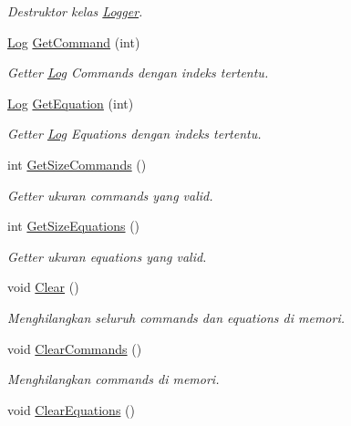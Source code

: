 \begin{DoxyCompactItemize}
\begin{DoxyCompactList}\small\item\em Destruktor kelas \hyperlink{class_logger}{Logger}. \end{DoxyCompactList}\item 
\hyperlink{class_log}{Log} \hyperlink{class_logger_a17879024b3d7becb09c6a4f97d3b0864}{Get\+Command} (int)
\begin{DoxyCompactList}\small\item\em Getter \hyperlink{class_log}{Log} Commands dengan indeks tertentu. \end{DoxyCompactList}\item 
\hyperlink{class_log}{Log} \hyperlink{class_logger_a375befae83c2783b4dae46345dab4466}{Get\+Equation} (int)
\begin{DoxyCompactList}\small\item\em Getter \hyperlink{class_log}{Log} Equations dengan indeks tertentu. \end{DoxyCompactList}\item 
int \hyperlink{class_logger_aeabc3b7d9fa5e616649f9779592907dd}{Get\+Size\+Commands} ()
\begin{DoxyCompactList}\small\item\em Getter ukuran commands yang valid. \end{DoxyCompactList}\item 
int \hyperlink{class_logger_a8b8bee01fd0f6e9d1782da3536b57b89}{Get\+Size\+Equations} ()
\begin{DoxyCompactList}\small\item\em Getter ukuran equations yang valid. \end{DoxyCompactList}\item 
\hypertarget{class_logger_a1191038d1044a1121e03cc267e9c681c}{}void \hyperlink{class_logger_a1191038d1044a1121e03cc267e9c681c}{Clear} ()\label{class_logger_a1191038d1044a1121e03cc267e9c681c}

\begin{DoxyCompactList}\small\item\em Menghilangkan seluruh commands dan equations di memori. \end{DoxyCompactList}\item 
\hypertarget{class_logger_a9adae6b89c3f6e6e21fde39fa5028bff}{}void \hyperlink{class_logger_a9adae6b89c3f6e6e21fde39fa5028bff}{Clear\+Commands} ()\label{class_logger_a9adae6b89c3f6e6e21fde39fa5028bff}

\begin{DoxyCompactList}\small\item\em Menghilangkan commands di memori. \end{DoxyCompactList}\item 
\hypertarget{class_logger_a661750c096426b6f5e9d3997720b6850}{}void \hyperlink{class_logger_a661750c096426b6f5e9d3997720b6850}{Clear\+Equations} ()\label{class_logger_a661750c096426b6f5e9d3997720b6850}


\end{DoxyCompactItemize}
